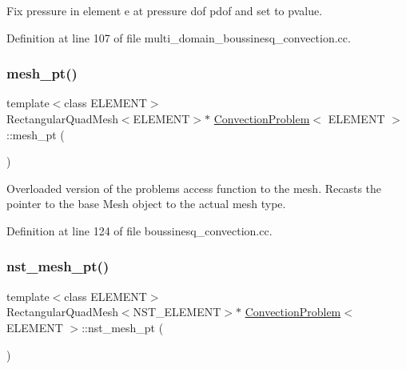 Fix pressure in element e at pressure dof pdof and set to pvalue. 



Definition at line 107 of file multi\+\_\+domain\+\_\+boussinesq\+\_\+convection.\+cc.

\mbox{\label{classConvectionProblem_ad338a7928f0467b0fbad1b448c9a47c2}} 
\subsubsection{\texorpdfstring{mesh\+\_\+pt()}{mesh\_pt()}}
{\footnotesize\ttfamily template$<$class E\+L\+E\+M\+E\+NT$>$ \\
Rectangular\+Quad\+Mesh$<$E\+L\+E\+M\+E\+NT$>$$\ast$ \hyperlink{classConvectionProblem}{Convection\+Problem}$<$ E\+L\+E\+M\+E\+NT $>$\+::mesh\+\_\+pt (\begin{DoxyParamCaption}{ }\end{DoxyParamCaption})\hspace{0.3cm}{\ttfamily [inline]}}



Overloaded version of the problem\textquotesingle{}s access function to the mesh. Recasts the pointer to the base Mesh object to the actual mesh type. 



Definition at line 124 of file boussinesq\+\_\+convection.\+cc.

\mbox{\label{classConvectionProblem_a55cd8ffe7b4aa2165639dfdbe6006962}} 
\subsubsection{\texorpdfstring{nst\+\_\+mesh\+\_\+pt()}{nst\_mesh\_pt()}}
{\footnotesize\ttfamily template$<$class E\+L\+E\+M\+E\+NT$>$ \\
Rectangular\+Quad\+Mesh$<$N\+S\+T\+\_\+\+E\+L\+E\+M\+E\+NT$>$$\ast$ \hyperlink{classConvectionProblem}{Convection\+Problem}$<$ E\+L\+E\+M\+E\+NT $>$\+::nst\+\_\+mesh\+\_\+pt (\begin{DoxyParamCaption}{ }\end{DoxyParamCaption})\hspace{0.3cm}{\ttfamily [inline]}}




